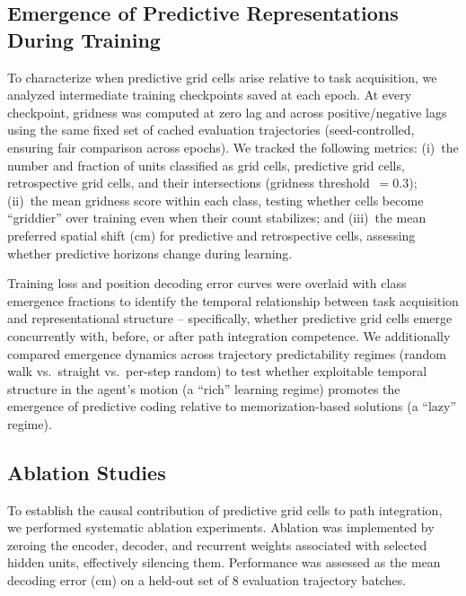 \documentclass[11pt]{article}
\begin{document}

\subsection*{Emergence of Predictive Representations During Training}

To characterize when predictive grid cells arise relative to task acquisition, we analyzed intermediate training checkpoints saved at each epoch. At every checkpoint, gridness was computed at zero lag and across positive/negative lags using the same fixed set of cached evaluation trajectories (seed-controlled, ensuring fair comparison across epochs). We tracked the following metrics: (i)~the number and fraction of units classified as grid cells, predictive grid cells, retrospective grid cells, and their intersections (gridness threshold~$= 0.3$); (ii)~the mean gridness score within each class, testing whether cells become ``griddier'' over training even when their count stabilizes; and (iii)~the mean preferred spatial shift (cm) for predictive and retrospective cells, assessing whether predictive horizons change during learning.

Training loss and position decoding error curves were overlaid with class emergence fractions to identify the temporal relationship between task acquisition and representational structure -- specifically, whether predictive grid cells emerge concurrently with, before, or after path integration competence. We additionally compared emergence dynamics across trajectory predictability regimes (random walk vs.\ straight vs.\ per-step random) to test whether exploitable temporal structure in the agent's motion (a ``rich'' learning regime) promotes the emergence of predictive coding relative to memorization-based solutions (a ``lazy'' regime).


\subsection*{Ablation Studies}

To establish the causal contribution of predictive grid cells to path integration, we performed systematic ablation experiments. Ablation was implemented by zeroing the encoder, decoder, and recurrent weights associated with selected hidden units, effectively silencing them. Performance was assessed as the mean decoding error (cm) on a held-out set of 8 evaluation trajectory batches.
\end{document}
